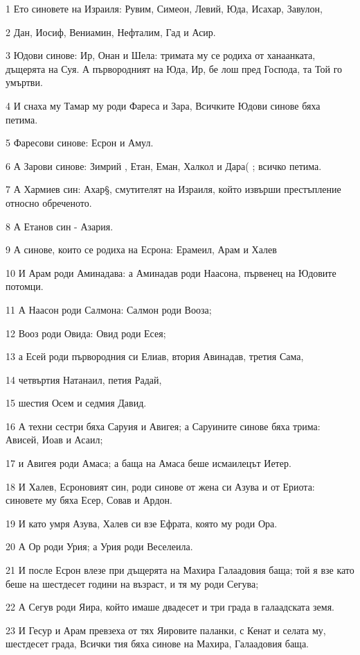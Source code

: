 \par 1 Ето синовете на Израиля: Рувим, Симеон, Левий, Юда, Исахар, Завулон,
\par 2 Дан, Иосиф, Вениамин, Нефталим, Гад и Асир.
\par 3 Юдови синове: Ир, Онан и Шела: тримата му се родиха от ханаанката, дъщерята на Суя. А първородният на Юда, Ир, бе лош пред Господа, та Той го умъртви.
\par 4 И снаха му Тамар му роди Фареса и Зара, Всичките Юдови синове бяха петима.
\par 5 Фаресови синове: Есрон и Амул.
\par 6 А Зарови синове: Зимрий , Етан, Еман, Халкол и Дара( ; всичко петима.
\par 7 А Хармиев син: Ахар§, смутителят на Израиля, който извърши престъпление относно обреченото.
\par 8 А Етанов син - Азария.
\par 9 А синове, които се родиха на Есрона: Ерамеил, Арам и Халев
\par 10 И Арам роди Аминадава: а Аминадав роди Наасона, първенец на Юдовите потомци.
\par 11 А Наасон роди Салмона: Салмон роди Вооза;
\par 12 Вооз роди Овида: Овид роди Есея;
\par 13 а Есей роди първородния си Елиав, втория Авинадав, третия Сама,
\par 14 четвъртия Натанаил, петия Радай,
\par 15 шестия Осем и седмия Давид.
\par 16 А техни сестри бяха Саруия и Авигея; а Саруините синове бяха трима: Ависей, Иоав и Асаил;
\par 17 и Авигея роди Амаса; а баща на Амаса беше исмаилецът Иетер.
\par 18 И Халев, Есроновият син, роди синове от жена си Азува и от Ериота: синовете му бяха Есер, Совав и Ардон.
\par 19 И като умря Азува, Халев си взе Ефрата, която му роди Ора.
\par 20 А Ор роди Урия; а Урия роди Веселеила.
\par 21 И после Есрон влезе при дъщерята на Махира Галаадовия баща; той я взе като беше на шестдесет години на възраст, и тя му роди Сегува;
\par 22 А Сегув роди Яира, който имаше двадесет и три града в галаадската земя.
\par 23 И Гесур и Арам превзеха от тях Яировите паланки, с Кенат и селата му, шестдесет града, Всички тия бяха синове на Махира, Галаадовия баща.
